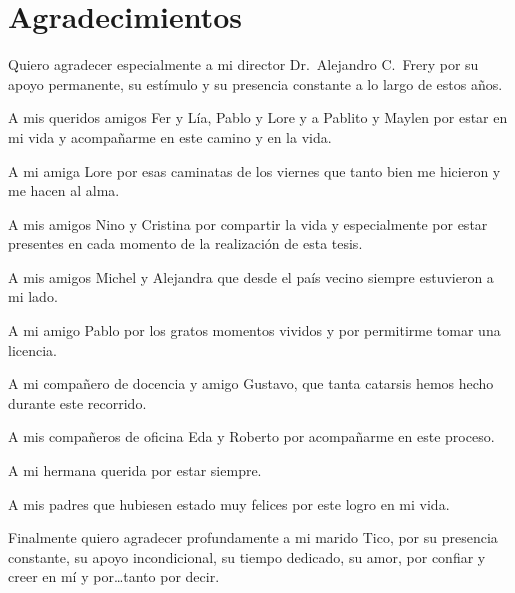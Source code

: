 
\chapter*{Agradecimientos}

Quiero agradecer especialmente a mi director Dr.\ Alejandro C.\ Frery por su apoyo permanente, su estímulo y su presencia constante a lo largo de estos años. 

A mis queridos amigos Fer y Lía, Pablo y Lore y a Pablito y Maylen por estar en mi vida y acompañarme en este camino y en la vida.

A mi amiga Lore por esas caminatas de los viernes que tanto bien me hicieron y me hacen al alma.

A mis amigos Nino y Cristina por compartir la vida y especialmente por estar presentes en cada momento de la realización de esta tesis.

A mis amigos Michel y Alejandra que desde el país vecino siempre estuvieron a mi lado.

A mi amigo Pablo por los gratos momentos vividos y por permitirme tomar una licencia.

A mi compañero de docencia y amigo Gustavo, que tanta catarsis hemos hecho durante este recorrido.

A mis compañeros de oficina Eda y Roberto por acompañarme en este proceso. 

A mi hermana querida por estar siempre.

A mis padres que hubiesen estado muy felices por este logro en mi vida.

Finalmente quiero agradecer profundamente a mi marido Tico, por su presencia constante, su apoyo incondicional, su tiempo dedicado, su amor, por confiar y creer en mí y por\dots tanto por decir.
